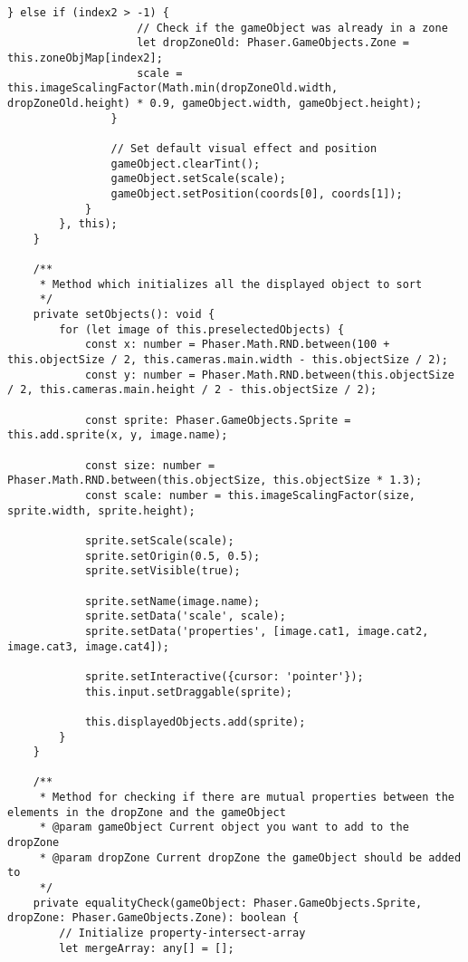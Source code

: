 \begin{lstlisting}[style=TypeScript, caption={restrictedSortingScene.ts}]
                } else if (index2 > -1) {
                    // Check if the gameObject was already in a zone
                    let dropZoneOld: Phaser.GameObjects.Zone = this.zoneObjMap[index2];
                    scale = this.imageScalingFactor(Math.min(dropZoneOld.width, dropZoneOld.height) * 0.9, gameObject.width, gameObject.height);
                }

                // Set default visual effect and position
                gameObject.clearTint();
                gameObject.setScale(scale);
                gameObject.setPosition(coords[0], coords[1]);
            }
        }, this);
    }

    /**
     * Method which initializes all the displayed object to sort
     */
    private setObjects(): void {
        for (let image of this.preselectedObjects) {
            const x: number = Phaser.Math.RND.between(100 + this.objectSize / 2, this.cameras.main.width - this.objectSize / 2);
            const y: number = Phaser.Math.RND.between(this.objectSize / 2, this.cameras.main.height / 2 - this.objectSize / 2);

            const sprite: Phaser.GameObjects.Sprite = this.add.sprite(x, y, image.name);

            const size: number = Phaser.Math.RND.between(this.objectSize, this.objectSize * 1.3);
            const scale: number = this.imageScalingFactor(size, sprite.width, sprite.height);

            sprite.setScale(scale);
            sprite.setOrigin(0.5, 0.5);
            sprite.setVisible(true);

            sprite.setName(image.name);
            sprite.setData('scale', scale);
            sprite.setData('properties', [image.cat1, image.cat2, image.cat3, image.cat4]);

            sprite.setInteractive({cursor: 'pointer'});
            this.input.setDraggable(sprite);

            this.displayedObjects.add(sprite);
        }
    }

    /**
     * Method for checking if there are mutual properties between the elements in the dropZone and the gameObject
     * @param gameObject Current object you want to add to the dropZone
     * @param dropZone Current dropZone the gameObject should be added to
     */
    private equalityCheck(gameObject: Phaser.GameObjects.Sprite, dropZone: Phaser.GameObjects.Zone): boolean {
        // Initialize property-intersect-array
        let mergeArray: any[] = [];


\end{lstlisting}
